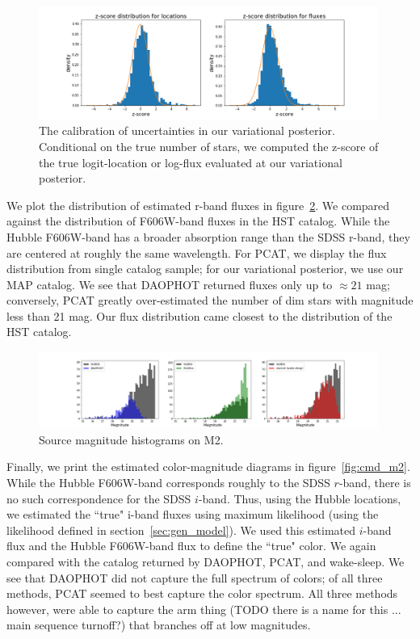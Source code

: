 \begin{figure}[h]
    \centering
    \includegraphics[width=0.99\textwidth]{figures/z-score_calibration.png}
    \caption{The calibration of uncertainties in our variational posterior. Conditional on the true number of stars, we computed the z-score of the true logit-location or log-flux evaluated at our
    variational posterior. }
    \label{fig:z-score_calibration}
\end{figure}

We plot the distribution of estimated r-band fluxes in figure~\ref{fig:luminosity_fun_m2}. We compared 
against the distribution of F606W-band fluxes in the HST catalog. While the Hubble F606W-band has a broader absorption range than the SDSS r-band, they are centered at roughly the same wavelength. For PCAT, we display the flux distribution from single catalog sample; for our variational 
posterior, we use our MAP catalog. We see that DAOPHOT returned fluxes only up to $\approx21$ mag; 
conversely, PCAT greatly over-estimated the number of dim stars with magnitude less than 21 mag. Our flux distribution came closest to the distribution of the HST catalog. 

\begin{figure}[h]
    \centering
    \includegraphics[width=0.99\textwidth]{figures/luminosity_fun.png}
    \caption{Source magnitude histograms on M2. }
    \label{fig:luminosity_fun_m2}
\end{figure}

Finally, we print the estimated color-magnitude diagrams in figure~\ref{fig:cmd_m2}. While the Hubble F606W-band corresponds roughly to the SDSS $r$-band, there is no such correspondence for the SDSS $i$-band. Thus, using the Hubble locations, we estimated the ``true" i-band fluxes using maximum 
likelihood (using the likelihood defined in section~\ref{sec:gen_model}). We used this estimated $i$-band flux and the Hubble F606W-band flux to define the ``true" color. We again compared with the catalog returned by DAOPHOT, PCAT, and wake-sleep. We see that DAOPHOT did not capture the full spectrum of colors; of all three methods, PCAT seemed to best capture the color spectrum. All three methods however, were able to capture the arm thing (TODO there is a name for this ... main sequence turnoff?) that branches off at low magnitudes. 

